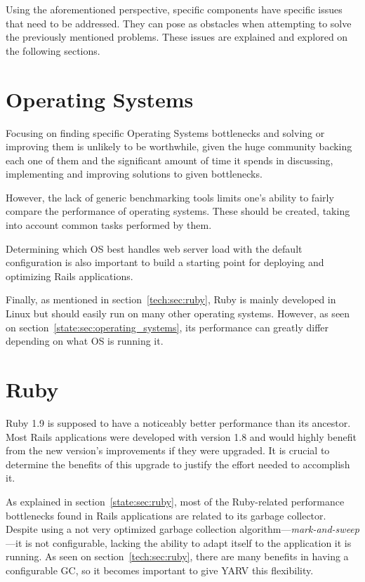 Using the aforementioned perspective, specific components have specific issues that need to be addressed. They can pose as obstacles when attempting to solve the previously mentioned problems. These issues are explained and explored on the following sections.

\section{Operating Systems}
Focusing on finding specific Operating Systems bottlenecks and solving or improving them is unlikely to be worthwhile, given the huge community backing each one of them and the significant amount of time it spends in discussing, implementing and improving solutions to given bottlenecks.

However, the lack of generic benchmarking tools limits one's ability to fairly compare the performance of operating systems. These should be created, taking into account common tasks performed by them. 

Determining which OS best handles web server load with the default configuration is also important to build a starting point for deploying and optimizing Rails applications. 

Finally, as mentioned in section~\ref{tech:sec:ruby}, Ruby is mainly developed in Linux but should easily run on many other operating systems. However, as seen on section~\ref{state:sec:operating_systems}, its performance can greatly differ depending on what OS is running it.

\section{Ruby}
Ruby 1.9 is supposed to have a noticeably better performance than its ancestor. Most Rails applications were developed with version 1.8 and would highly benefit from the new version's improvements if they were upgraded. It is crucial to determine the benefits of this upgrade to justify the effort needed to accomplish it. 

As explained in section~\ref{state:sec:ruby}, most of the Ruby-related performance bottlenecks found in Rails applications are related to its garbage collector. Despite using a not very optimized garbage collection algorithm---\textit{mark-and-sweep}---it is not configurable, lacking the ability to adapt itself to the application it is running. As seen on section~\ref{tech:sec:ruby}, there are many benefits in having a configurable GC, so it becomes important to give YARV this flexibility. 

